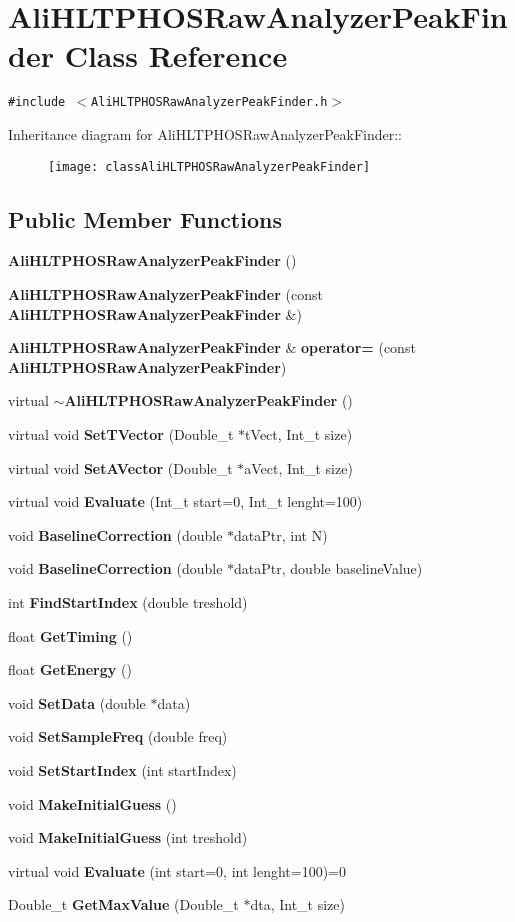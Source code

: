 \section{Ali\-HLTPHOSRaw\-Analyzer\-Peak\-Finder Class Reference}
\label{classAliHLTPHOSRawAnalyzerPeakFinder}
{\tt \#include $<$Ali\-HLTPHOSRaw\-Analyzer\-Peak\-Finder.h$>$}

Inheritance diagram for Ali\-HLTPHOSRaw\-Analyzer\-Peak\-Finder::\begin{figure}[H]
\begin{center}
\leavevmode
\texttt{[image: classAliHLTPHOSRawAnalyzerPeakFinder]}
\end{center}
\end{figure}
\subsection*{Public Member Functions}
\begin{CompactItemize}
\item 
{\bf Ali\-HLTPHOSRaw\-Analyzer\-Peak\-Finder} ()
\item 
{\bf Ali\-HLTPHOSRaw\-Analyzer\-Peak\-Finder} (const {\bf Ali\-HLTPHOSRaw\-Analyzer\-Peak\-Finder} \&)
\item 
{\bf Ali\-HLTPHOSRaw\-Analyzer\-Peak\-Finder} \& {\bf operator=} (const {\bf Ali\-HLTPHOSRaw\-Analyzer\-Peak\-Finder})
\item 
virtual {\bf $\sim$Ali\-HLTPHOSRaw\-Analyzer\-Peak\-Finder} ()
\item 
virtual void {\bf Set\-TVector} (Double\_\-t $\ast$t\-Vect, Int\_\-t size)
\item 
virtual void {\bf Set\-AVector} (Double\_\-t $\ast$a\-Vect, Int\_\-t size)
\item 
virtual void {\bf Evaluate} (Int\_\-t start=0, Int\_\-t lenght=100)
\item 
void {\bf Baseline\-Correction} (double $\ast$data\-Ptr, int N)
\item 
void {\bf Baseline\-Correction} (double $\ast$data\-Ptr, double baseline\-Value)
\item 
int {\bf Find\-Start\-Index} (double treshold)
\item 
float {\bf Get\-Timing} ()
\item 
float {\bf Get\-Energy} ()
\item 
void {\bf Set\-Data} (double $\ast$data)
\item 
void {\bf Set\-Sample\-Freq} (double freq)
\item 
void {\bf Set\-Start\-Index} (int start\-Index)
\item 
void {\bf Make\-Initial\-Guess} ()
\item 
void {\bf Make\-Initial\-Guess} (int treshold)
\item 
virtual void {\bf Evaluate} (int start=0, int lenght=100)=0
\item 
Double\_\-t {\bf Get\-Max\-Value} (Double\_\-t $\ast$dta, Int\_\-t size)
\end{CompactItemize}
